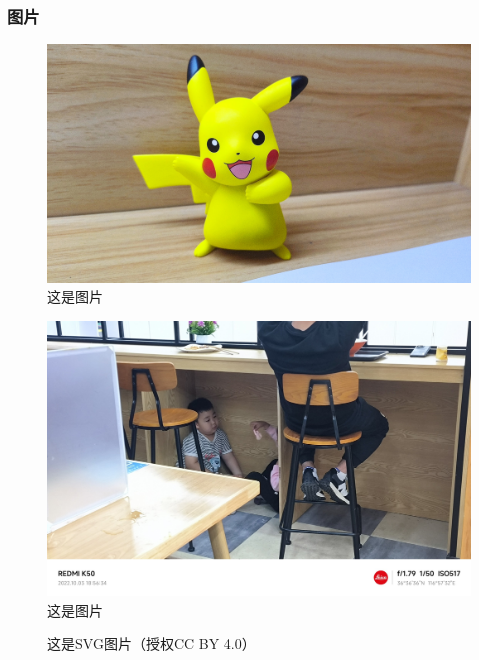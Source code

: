 \begin{ujnbody}
    \subsubsection{图片}
    \begin{figure}[htbp]
        \centering
        \includegraphics[scale=0.1]{figures/pikachu.jpg}
        \caption{这是图片}
        \label{fig:1}
    \end{figure}
    \begin{figure}[htbp]
        \centering
        \includegraphics[scale=0.1]{figures/children.jpg}
        \caption{这是图片}
        \label{fig:2}
    \end{figure}
    \begin{figure}[htbp]
        \centering
        
        \caption{这是SVG图片（授权CC BY 4.0）}
        \label{fig:latex-project-logo}
      \end{figure}

\end{ujnbody}
